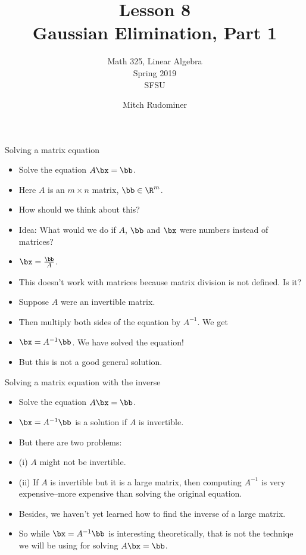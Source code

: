 \documentclass{beamer}
\title{Lesson 8\\ Gaussian Elimination, Part 1}
\subtitle{Math 325, Linear Algebra \\ Spring 2019 \\ SFSU}
\author{Mitch Rudominer}
\date{}
\begin{document}
\begin{frame}
  \titlepage
\end{frame}

\begin{frame}{Solving a matrix equation}

\begin{itemize}
\item Solve the equation $A\bx=\bb$.
\item Here $A$ is an $m\times n$ matrix, $\bb\in\R^{m}$.
\item How should we think about this?
\item Idea: What would we do if $A$, $\bb$ and $\bx$ were numbers instead of matrices?
\item $\bx = \frac{\bb}{A}$.
\item This doesn't work with matrices because matrix division is not defined. Is it?
\item Suppose $A$ were an invertible matrix.
\item Then multiply both sides of the equation by $A^{-1}$. We get
\item $\bx = A^{-1}\bb$. We have solved the equation!
\item But this is not a good general solution.
\end{itemize}
\end{frame}


\begin{frame}{Solving a matrix equation with the inverse}

\begin{itemize}
\item Solve the equation $A\bx=\bb$.
\item $\bx = A^{-1}\bb$ is a solution if $A$ is invertible.
\item But there are two problems:
\item (i) $A$ might not be invertible.
\item (ii) If $A$ is invertible but it is a large matrix, then computing
$A^{-1}$ is very expensive--more expensive than solving the original equation.
\item Besides, we haven't yet learned how to find the inverse of a large matrix.
\item So while $\bx = A^{-1}\bb$ is interesting theoretically, that is
not the techniqe we will be using for solving $A\bx=\bb$.
\end{itemize}
\end{frame}
\end{document}
